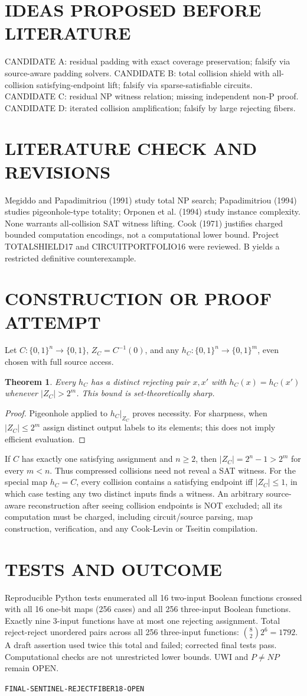 \documentclass{article}
\newtheorem{theorem}{Theorem}
\begin{document}
\section{IDEAS PROPOSED BEFORE LITERATURE}
CANDIDATE A: residual padding with exact coverage preservation; falsify via source-aware padding solvers. CANDIDATE B: total collision shield with all-collision satisfying-endpoint lift; falsify via sparse-satisfiable circuits. CANDIDATE C: residual NP witness relation; missing independent non-P proof. CANDIDATE D: iterated collision amplification; falsify by large rejecting fibers.
\section{LITERATURE CHECK AND REVISIONS}
Megiddo and Papadimitriou (1991) study total NP search; Papadimitriou (1994) studies pigeonhole-type totality; Orponen et al. (1994) study instance complexity. None warrants all-collision SAT witness lifting. Cook (1971) justifies charged bounded computation encodings, not a computational lower bound. Project TOTALSHIELD17 and CIRCUITPORTFOLIO16 were reviewed. B yields a restricted definitive counterexample.
\section{CONSTRUCTION OR PROOF ATTEMPT}
Let $C:\{0,1\}^n\to\{0,1\}$, $Z_C=C^{-1}(0)$, and any $h_C:\{0,1\}^n\to\{0,1\}^m$, even chosen with full source access.
\begin{theorem}
Every $h_C$ has a distinct rejecting pair $x,x'$ with $h_C(x)=h_C(x')$ whenever $|Z_C|>2^m$. This bound is set-theoretically sharp.
\end{theorem}
\begin{proof}
Pigeonhole applied to $h_C|_{Z_C}$ proves necessity. For sharpness, when $|Z_C|\le2^m$ assign distinct output labels to its elements; this does not imply efficient evaluation.
\end{proof}
If $C$ has exactly one satisfying assignment and $n\ge2$, then $|Z_C|=2^n-1>2^m$ for every $m<n$. Thus compressed collisions need not reveal a SAT witness. For the special map $h_C=C$, every collision contains a satisfying endpoint iff $|Z_C|\le1$, in which case testing any two distinct inputs finds a witness. An arbitrary source-aware reconstruction after seeing collision endpoints is NOT excluded; all its computation must be charged, including circuit/source parsing, map construction, verification, and any Cook-Levin or Tseitin compilation.
\section{TESTS AND OUTCOME}
Reproducible Python tests enumerated all 16 two-input Boolean functions crossed with all 16 one-bit maps (256 cases) and all 256 three-input Boolean functions. Exactly nine 3-input functions have at most one rejecting assignment. Total reject-reject unordered pairs across all 256 three-input functions: $\binom82 2^6=1792$. A draft assertion used twice this total and failed; corrected final tests pass. Computational checks are not unrestricted lower bounds. UWI and $P\ne NP$ remain OPEN.
\par\noindent\texttt{FINAL-SENTINEL-REJECTFIBER18-OPEN}
\end{document}
